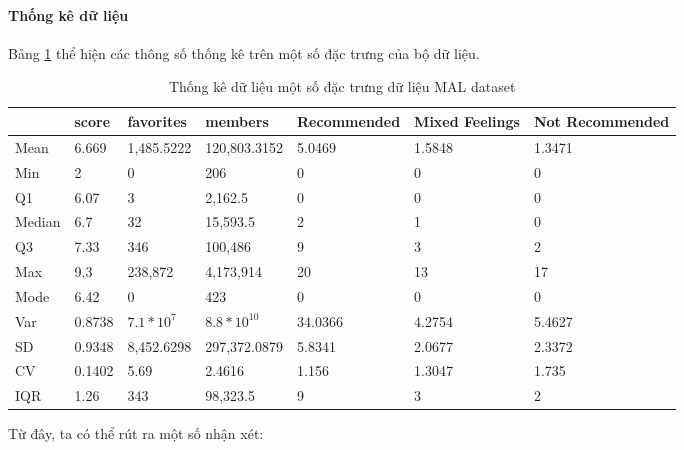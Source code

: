     
    \paragraph{Thống kê dữ liệu}
        \leavevmode

    Bảng \ref{tab:stat-mal} thể hiện các thông số thống kê trên một số đặc trưng của bộ dữ liệu.    

    \begin{table}[htbp]
    \centering
    \caption{ Thống kê dữ liệu một số đặc trưng dữ liệu MAL dataset}
    \label{tab:stat-mal}
    \begin{tabular}{|l|l|l|l|p{2.5cm}|p{2cm}|p{2.5cm}|}
        \hline
          & score & favorites & members & Recommended & Mixed Feelings & Not Recommended \\
        \hline
        Mean & 6.669 & 1,485.5222 & 120,803.3152 & 5.0469 & 1.5848 & 1.3471 \\
        \hline
        Min & 2 & 0 & 206 & 0 & 0 & 0 \\
        \hline
        Q1 & 6.07 & 3 & 2,162.5 & 0 & 0 & 0 \\
        \hline
        Median & 6.7 & 32 & 15,593.5 & 2 & 1 & 0 \\
        \hline
        Q3 & 7.33 & 346 & 100,486 & 9 & 3 & 2 \\
        \hline
        Max & 9.3 & 238,872 & 4,173,914 & 20 & 13 & 17 \\
        \hline
        Mode & 6.42 & 0 & 423 & 0 & 0 & 0 \\
        \hline
        Var & 0.8738 & $7.1*10^7$ & $8.8*10^{10}$ & 34.0366 & 4.2754 & 5.4627 \\
        \hline
        SD & 0.9348 & 8,452.6298 & 297,372.0879 & 5.8341 & 2.0677 & 2.3372 \\
        \hline
        CV & 0.1402 & 5.69 & 2.4616 & 1.156 & 1.3047 & 1.735 \\
        \hline
        IQR & 1.26 & 343 & 98,323.5 & 9 & 3 & 2 \\
        \hline
    \end{tabular}
    \end{table}

    Từ đây, ta có thể rút ra một số nhận xét:
    
